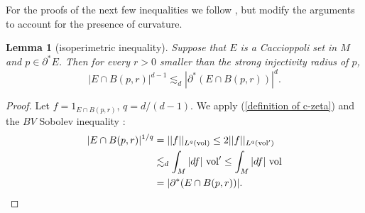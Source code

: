 \documentclass[reqno,12pt,letterpaper]{amsart}
\newcommand{\vol}{\mathrm{vol}}
\newtheorem{lemma}[theorem]{Lemma}
\theoremstyle{definition}
\numberwithin{equation}{section}
\begin{document}
For the proofs of the next few inequalities we follow \cite{Mooney11}, but modify the arguments to account for the presence of curvature.

\begin{lemma}[isoperimetric inequality]\label{isoperimetric inequality}
Suppose that $E$ is a Caccioppoli set in $M$ and $p \in \partial^* E$.
Then for every $r > 0$ smaller than the strong injectivity radius of $p$,
$$|E \cap B(p, r)|^{d - 1} \lesssim_d |\partial^*(E \cap B(p, r))|^d.$$
\end{lemma}
\begin{proof}
Let $f = 1_{E \cap B(p, r)}$, $q = d/(d-1)$.
We apply (\ref{definition of c-zeta}) and the $BV$ Sobolev inequality \cite[\S5.6.1]{evans1991measure}:
\begin{align*}
|E \cap B(p, r)|^{1/q} &= ||f||_{L^q(\vol)} \leq 2||f||_{L^q(\vol')} \\
&\lesssim_d \int_M |df| ~\vol' \leq \int_M |df| ~\vol\\
&= |\partial^*(E \cap B(p, r))|. \qedhere
\end{align*}
\end{proof}
\end{document}
